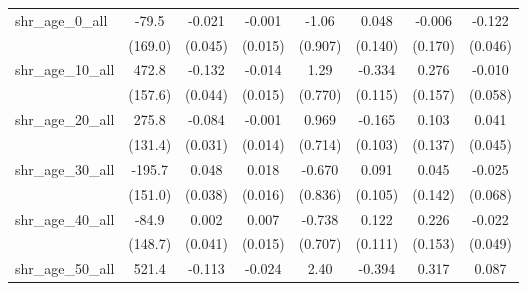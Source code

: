 \begin{table}[htbp]
\begin{tabular}{lccccccc}
      shr\_age\_0\_all          & -79.5                   & -0.021                  & -0.001                  & -1.06                   & 0.048                   & -0.006                  & -0.122\\   
                                & (169.0)                 & (0.045)                 & (0.015)                 & (0.907)                 & (0.140)                 & (0.170)                 & (0.046)\\   
      shr\_age\_10\_all         & 472.8                   & -0.132                  & -0.014                  & 1.29                    & -0.334                  & 0.276                   & -0.010\\   
                                & (157.6)                 & (0.044)                 & (0.015)                 & (0.770)                 & (0.115)                 & (0.157)                 & (0.058)\\   
      shr\_age\_20\_all         & 275.8                   & -0.084                  & -0.001                  & 0.969                   & -0.165                  & 0.103                   & 0.041\\   
                                & (131.4)                 & (0.031)                 & (0.014)                 & (0.714)                 & (0.103)                 & (0.137)                 & (0.045)\\   
      shr\_age\_30\_all         & -195.7                  & 0.048                   & 0.018                   & -0.670                  & 0.091                   & 0.045                   & -0.025\\   
                                & (151.0)                 & (0.038)                 & (0.016)                 & (0.836)                 & (0.105)                 & (0.142)                 & (0.068)\\   
      shr\_age\_40\_all         & -84.9                   & 0.002                   & 0.007                   & -0.738                  & 0.122                   & 0.226                   & -0.022\\   
                                & (148.7)                 & (0.041)                 & (0.015)                 & (0.707)                 & (0.111)                 & (0.153)                 & (0.049)\\   
      shr\_age\_50\_all         & 521.4                   & -0.113                  & -0.024                  & 2.40                    & -0.394                  & 0.317                   & 0.087\\   

\end{tabular}
\end{table}
